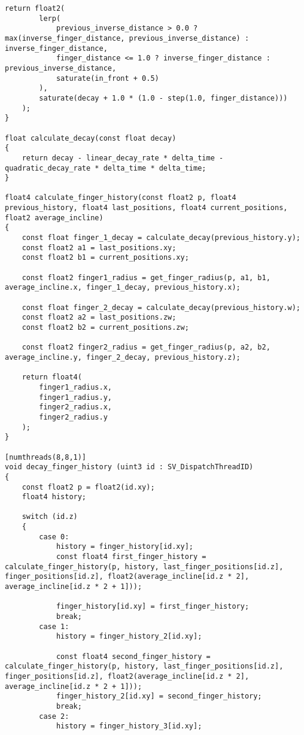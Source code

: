 \begin{lstlisting}[language=HLSL]
    return float2(
        lerp(
            previous_inverse_distance > 0.0 ? max(inverse_finger_distance, previous_inverse_distance) : inverse_finger_distance,
            finger_distance <= 1.0 ? inverse_finger_distance : previous_inverse_distance,
            saturate(in_front + 0.5)
        ),
        saturate(decay + 1.0 * (1.0 - step(1.0, finger_distance)))
    );
}

float calculate_decay(const float decay)
{
    return decay - linear_decay_rate * delta_time - quadratic_decay_rate * delta_time * delta_time;
}

float4 calculate_finger_history(const float2 p, float4 previous_history, float4 last_positions, float4 current_positions, float2 average_incline)
{
    const float finger_1_decay = calculate_decay(previous_history.y);
    const float2 a1 = last_positions.xy;
    const float2 b1 = current_positions.xy;

    const float2 finger1_radius = get_finger_radius(p, a1, b1, average_incline.x, finger_1_decay, previous_history.x);

    const float finger_2_decay = calculate_decay(previous_history.w);
    const float2 a2 = last_positions.zw;
    const float2 b2 = current_positions.zw;

    const float2 finger2_radius = get_finger_radius(p, a2, b2, average_incline.y, finger_2_decay, previous_history.z);

    return float4(
        finger1_radius.x,
        finger1_radius.y,
        finger2_radius.x,
        finger2_radius.y
    );
}

[numthreads(8,8,1)]
void decay_finger_history (uint3 id : SV_DispatchThreadID)
{
    const float2 p = float2(id.xy);
    float4 history;

    switch (id.z)
    {
        case 0:
            history = finger_history[id.xy];
            const float4 first_finger_history = calculate_finger_history(p, history, last_finger_positions[id.z], finger_positions[id.z], float2(average_incline[id.z * 2], average_incline[id.z * 2 + 1]));

            finger_history[id.xy] = first_finger_history;
            break;
        case 1:
            history = finger_history_2[id.xy];

            const float4 second_finger_history = calculate_finger_history(p, history, last_finger_positions[id.z], finger_positions[id.z], float2(average_incline[id.z * 2], average_incline[id.z * 2 + 1]));
            finger_history_2[id.xy] = second_finger_history;
            break;
        case 2:
            history = finger_history_3[id.xy];


\end{lstlisting}
